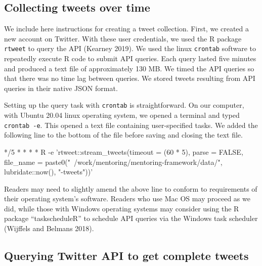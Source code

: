 \documentclass[
]{article}
\newenvironment{Shaded}{\begin{snugshade}}{\end{snugshade}}
\newcommand{\ExtensionTok}[1]{#1}
\newcommand{\NormalTok}[1]{#1}
\newcommand{\StringTok}[1]{\textcolor[rgb]{0.31,0.60,0.02}{#1}}
\begin{document}
\hypertarget{collecting-tweets-over-time}{%
\subsection{Collecting tweets over time}\label{collecting-tweets-over-time}}

We include here instructions for creating a tweet collection. First, we created a
new account on Twitter. With these user credentials, we used the
R package \texttt{rtweet} to query the API (Kearney 2019). We used the linux \texttt{crontab} software
to repeatedly execute R code to submit API queries. Each
query lasted five minutes and produced a text file of approximately 130 MB. We timed the API queries so
that there was no time lag between queries. We stored tweets resulting from API queries in their native JSON format.

Setting up the query task with \texttt{crontab} is straightforward. On our computer, with
Ubuntu 20.04 linux operating system, we opened a terminal and typed \texttt{crontab\ -e}. This
opened a text file containing user-specified tasks. We added the following line to the
bottom of the file before saving and closing the text file.

\begin{Shaded}
\begin{Highlighting}[]
\ExtensionTok{*/5}\NormalTok{ * * * * R -e }\StringTok{'rtweet::stream_tweets(timeout = (60 * 5), }
\StringTok{parse = FALSE, file_name = paste0("~/work/mentoring/mentoring-framework/data/",}
\StringTok{lubridate::now(), "-tweets"))'}
\end{Highlighting}
\end{Shaded}

Readers may need to slightly amend the above line to conform to requirements of
their operating system's software. Readers who use Mac OS may proceed as we did,
while those with Windows operating systems may consider using the R package
``taskscheduleR'' to schedule API queries via the Windows task scheduler (Wijffels and Belmans 2018).

\hypertarget{querying-twitter-api-to-get-complete-tweets}{%
\subsection{Querying Twitter API to get complete tweets}\label{querying-twitter-api-to-get-complete-tweets}}
\end{document}
